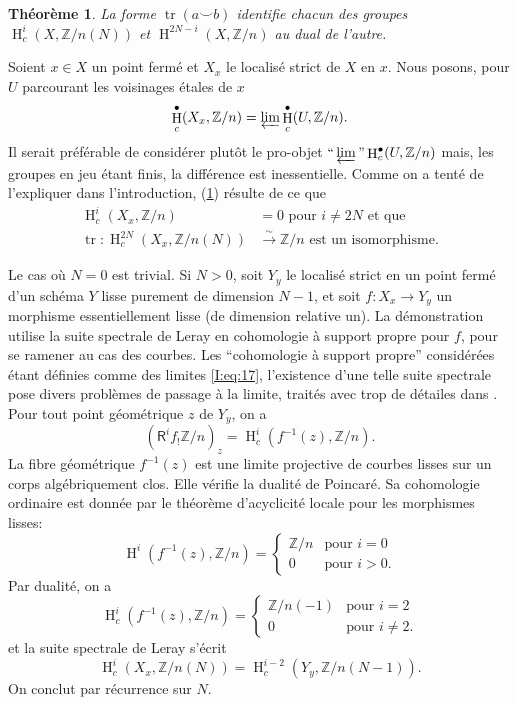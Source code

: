 \documentclass{book}
\DeclareMathOperator{\h}{H}
\DeclareMathOperator{\tr}{tr}
\newcommand{\dZ}{\mathbb{Z}}
\newcommand{\iso}{\xrightarrow\sim}
\newcommand{\R}{\mathsf{R}}
\newtheorem{theorem}[subsubsection]{Théorème}
\begin{document}
\begin{theorem}\label{I:6-3-1}
La forme $\tr(a\smallsmile b)$ identifie chacun des groupes 
$\h_c^i\left(X,\dZ/n(N)\right)$ et $\h^{2 N-i}(X,\dZ/n)$ au dual de l'autre.
\end{theorem}

Soient $x\in X$ un point fermé et $X_x$ le localisé strict de $X$ en $x$. 
Nous posons, pour $U$ parcourant les voisinages étales de $x$ 
\begin{equation}\label{I:eq:17}
  \h_c^\bullet(X_x,\dZ/n) = \varprojlim \h_c^\bullet(U,\dZ/n) \text{.}
\end{equation}
Il serait préférable de considérer plutôt le pro-objet 
$\text{``}\varprojlim\text{''} \h_c^\bullet(U,\dZ/n)$ mais, les groupes en jeu 
étant finis, la différence est inessentielle. Comme on a tenté de 
l'expliquer dans l'introduction, (\ref{I:6-3-1}) résulte de ce que 
\begin{equation}\label{I:eq:18}
\begin{aligned}
  \h_c^i(X_x,\dZ/n) &= 0 \text{ pour $i\ne 2N$ et que } \\
  \tr : \h_c^{2 N}\left(X_x,  \dZ/n(N)\right) &\iso \dZ/n \text{ est un isomorphisme.} 
\end{aligned}
\end{equation}

Le cas où $N=0$ est trivial. Si $N>0$, soit $Y_y$ le localisé strict en un 
point fermé d'un schéma $Y$ lisse purement de dimension $N-1$, et soit 
$f:X_x\to Y_y$ un morphisme essentiellement lisse (de dimension relative un). 
La démonstration utilise la suite spectrale de Leray en cohomologie à 
support propre pour $f$, pour se ramener au cas des courbes. Les ``cohomologie 
à support propre'' considérées étant définies comme des limites 
\eqref{I:eq:17}, l'existence d'une telle suite spectrale pose divers problèmes 
de passage à la limite, traités avec trop de détailes dans 
\cite[XVIII]{4}. Pour tout point géométrique $z$ de $Y_y$, on a 
\[
  (\R^if_! \dZ/n)_z = \h_c^i(f^{-1}(z),\dZ/n) \text{.}
\]
La fibre géométrique $f^{-1}(z)$ est une limite projective de courbes lisses 
sur un corps algébriquement clos. Elle vérifie la dualité de Poincaré. 
Sa cohomologie ordinaire est donnée par le théorème d'acyclicité locale 
pour les morphismes lisses: 
\[
  \h^i(f^{-1}(z),\dZ/n) 
    = \begin{cases}
        \dZ/n & \text{pour $i=0$} \\
        0     & \text{pour $i>0$.}
      \end{cases}
\]
Par dualité, on a 
\[
  \h_c^i(f^{-1}(z),\dZ/n) 
    = \begin{cases}
        \dZ/n(-1) & \text{pour $i=2$} \\
        0         & \text{pour $i\ne 2$.}
      \end{cases}
\]
et la suite spectrale de Leray s'écrit 
\[
  \h_c^i\left(X_x,\dZ/n(N)\right) = \h_c^{i-2}\left(Y_y,\dZ/n(N-1)\right) \text{.}
\]
On conclut par récurrence sur $N$. 
\end{document}
